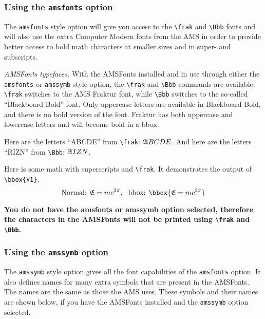 \subsubsection{Using the {\protect\tt amsfonts} option}
\label{sec:AMSFonts,amsfonts}

The \verb+amsfonts+ style option will give you
access to the \verb+\frak+ and \verb+\Bbb+ fonts and will also
use the extra Computer Modern fonts from the AMS in order to provide
better access to bold math characters at smaller sizes and in
super- and subscripts.

{\em AMSFonts typefaces.}
With the AMSFonts installed and in use through either the \verb+amsfonts+ or
\verb+amssymb+ style option, the \verb+\frak+ and \verb+\Bbb+ commands
are available. \verb+\frak+ switches to the AMS Fraktur font, while
\verb+\Bbb+ switches to the so-called ``Blackboard Bold'' font.
Only uppercase letters are available in Blackboard Bold, and there is
no bold version of the font. Fraktur has both uppercase and lowercase letters
and will become bold in a bbox.

\makeatletter

\def\foobar{\let\foo\iftrue}\let\foo\iffalse
\if@amssymbols\foobar\else\if@amsfonts\foobar\fi\fi

\foo
\makeatother

Here are the letters ``ABCDE'' from \verb+\frak+: $\frak ABCDE$.
And here are the letters ``RIZN'' from \verb+\Bbb+: $\Bbb RIZN$.

Here is some math with superscripts and \verb+\frak+. It demonstrates
the output of \verb+\bbox{#1}+.
\[\text{Normal: } {\frak E}=mc^{2\pi},
  \text{\ \ bbox: } \bbox{{\frak E}=mc^{2\pi}}
\]

\else
\makeatother
\bigskip
\begin{center}
\bf You do not have the amsfonts or amssymb option
selected, therefore the characters in the AMSFonts will not be
printed using \verb+\frak+ and \verb+\Bbb+.
\end{center}
\fi


\subsubsection{Using the {\protect\tt amssymb} option}
\label{sec:AMSFonts,symb}

The \verb+amssymb+ style option gives all the font capabilities of the
\verb+amsfonts+ option. It also defines names for many extra symbols that
are present in the AMSFonts. The names are the same as those the AMS uses.
These symbols and their names are shown below, if you have the AMSFonts
installed and the \verb+amssymb+ option selected.

